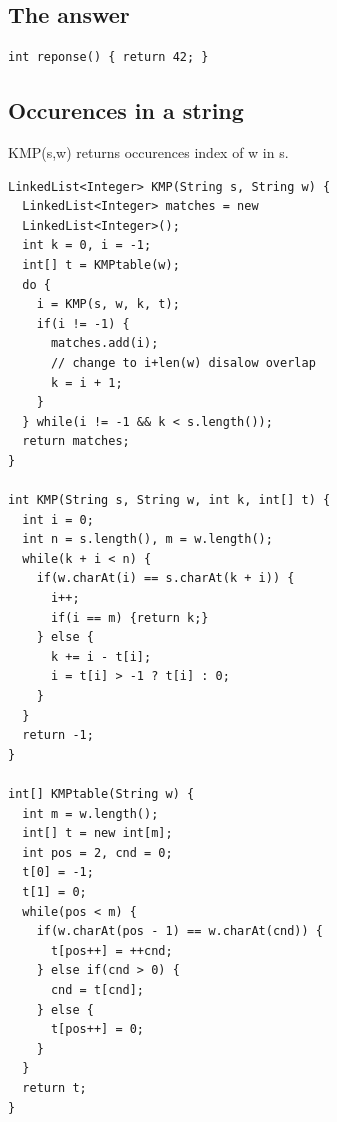 \subsection{The answer}
\begin{lstlisting}
int reponse() { return 42; }
\end{lstlisting}
\subsection{Occurences in a string}
KMP(s,w) returns occurences index of w in s.
\begin{lstlisting}
LinkedList<Integer> KMP(String s, String w) {
  LinkedList<Integer> matches = new  
  LinkedList<Integer>();
  int k = 0, i = -1;
  int[] t = KMPtable(w);
  do {
    i = KMP(s, w, k, t);
    if(i != -1) {
      matches.add(i);
      // change to i+len(w) disalow overlap
      k = i + 1; 
    }
  } while(i != -1 && k < s.length());
  return matches;
}
	
int KMP(String s, String w, int k, int[] t) {
  int i = 0;
  int n = s.length(), m = w.length();
  while(k + i < n) {
    if(w.charAt(i) == s.charAt(k + i)) {
      i++;
      if(i == m) {return k;}
    } else {
      k += i - t[i];
      i = t[i] > -1 ? t[i] : 0;
    }
  }
  return -1;
}

int[] KMPtable(String w) {
  int m = w.length();
  int[] t = new int[m];
  int pos = 2, cnd = 0;
  t[0] = -1;
  t[1] = 0;
  while(pos < m) {
    if(w.charAt(pos - 1) == w.charAt(cnd)) {
      t[pos++] = ++cnd;
    } else if(cnd > 0) {
      cnd = t[cnd];
    } else {
      t[pos++] = 0;
    }
  }
  return t;
}
\end{lstlisting}
